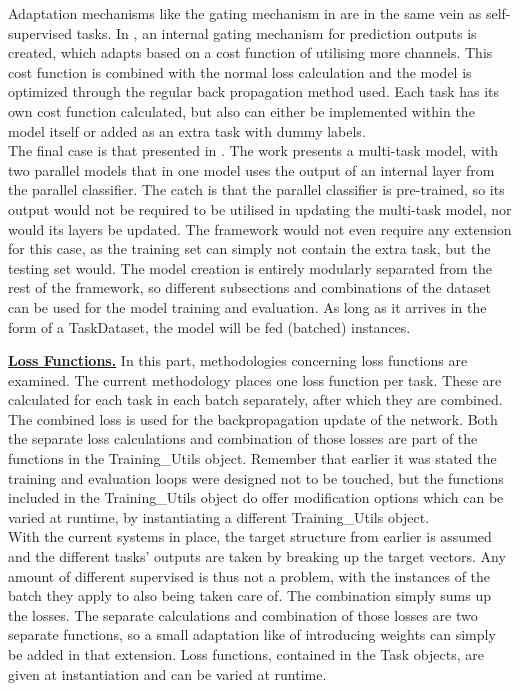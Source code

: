 Adaptation mechanisms like the gating mechanism in \cite{tagliasacchi2020multi} are in the same vein as self-supervised tasks. In \cite{tagliasacchi2020multi}, an internal gating mechanism for prediction outputs is created, which adapts based on a cost function of utilising more channels. This cost function is combined with the normal loss calculation and the model is optimized through the regular back propagation method used. Each task has its own cost function calculated, but also can either be implemented within the model itself or added as an extra task with dummy labels.\\

The final case is that presented in \cite{wu2020domain}. The work presents a multi-task model, with two parallel models that in one model uses the output of an internal layer from the parallel classifier. The catch is that the parallel classifier is pre-trained, so its output would not be required to be utilised in updating the multi-task model, nor would its layers be updated. The framework would not even require any extension for this case, as the training set can simply not contain the extra task, but the testing set would. The model creation is entirely modularly separated from the rest of the framework, so different subsections and combinations of the dataset can be used for the model training and evaluation. As long as it arrives in the form of a TaskDataset, the model will be fed (batched) instances.


\underline{\textbf{Loss Functions.}} In this part, methodologies concerning loss functions are examined. The current methodology places one loss function per task. These are calculated for each task in each batch separately, after which they are combined. The combined loss is used for the backpropagation update of the network. Both the separate loss calculations and combination of those losses are part of the functions in the Training\_Utils object. Remember that earlier it was stated the training and evaluation loops were designed not to be touched, but the functions included in the Training\_Utils object do offer modification options which can be varied at runtime, by instantiating a different Training\_Utils object. \\

With the current systems in place, the target structure from earlier is assumed and the different tasks' outputs are taken by breaking up the target vectors. Any amount of different supervised is thus not a problem, with the instances of the batch they apply to also being taken care of. The combination simply sums up the losses. The separate calculations and combination of those losses are two separate functions, so a small adaptation like \cite{park2020augmenting} of introducing weights can simply be added in that extension. Loss functions, contained in the Task objects, are given at instantiation and can be varied at runtime.\\


